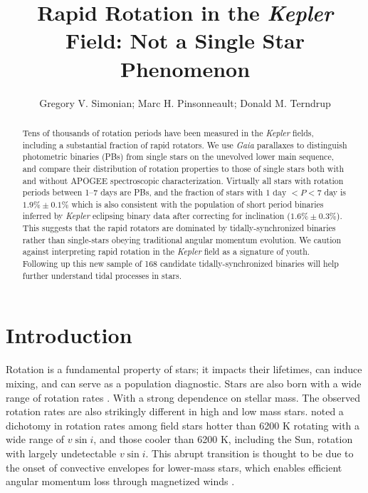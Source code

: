 \documentclass[manuscript]{aastex6}
\newcommand{\vsini}{\ensuremath{v \sin i}}
\newcommand{\Kepler}{\mbox{\textit{Kepler}}}
\newcommand{\Gaia}{\mbox{\textit{Gaia}}}
\begin{document}
\title{Rapid Rotation in the \Kepler{} Field: Not a Single Star
Phenomenon}
\author{Gregory V. Simonian; Marc H. Pinsonneault; Donald M. Terndrup}

\begin{abstract}
    Tens of thousands of rotation periods have been measured in the
    \Kepler{} fields, including a substantial fraction of rapid rotators. We 
    use \Gaia{} parallaxes to distinguish photometric binaries (PBs) from
    single stars on the unevolved lower main sequence, and compare their
    distribution of rotation properties to those of single stars both with and 
    without APOGEE spectroscopic characterization. Virtually all stars 
    with rotation periods between 1--7 days are PBs, and the fraction of stars
    with \(1 \textrm{ day } < P < 7\) day is \(1.9\% \pm 0.1\%\) which
    is also consistent with the population of short period binaries inferred 
    by \Kepler{} eclipsing binary data after correcting for inclination
    (\(1.6\% \pm 0.3\%\)). This suggests that the rapid rotators 
    are dominated by tidally-synchronized binaries rather than single-stars 
    obeying traditional angular momentum evolution. We caution 
    against interpreting rapid rotation in the \Kepler{} field 
    as a signature of youth. Following up this new sample of 168 candidate 
    tidally-synchronized binaries will help further understand 
    tidal processes in stars.
\end{abstract}

\section{Introduction}

Rotation is a fundamental property of stars; it impacts their lifetimes, can
induce mixing, and can serve as a population diagnostic. Stars are also born 
with a wide range of rotation rates \citep{Attridge92, Herbst00, Henderson12}.
With a strong dependence on stellar mass. The observed rotation rates are also
strikingly different in high and low mass stars. \citet{Kraft67} noted a 
dichotomy in rotation rates among field stars hotter than 6200 K rotating 
with a wide range of \vsini, and those cooler than 6200 K, including the Sun, 
rotation with largely undetectable \vsini. This abrupt transition is thought to
be due to the onset of convective envelopes for lower-mass stars, which 
enables efficient angular momentum loss through magnetized winds 
\citep{Parker58,Weber67}.
\end{document}
